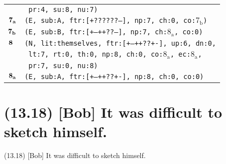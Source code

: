 \documentclass{article}
\begin{document}
\begin{minipage}{\textwidth}
{\begin{tabular}{|r|l|}
    & \texttt{\texttt{~pr:4,~su:8,~nu:7)}} \\
    ${\textbf{\textrm{7}}_{\textbf{\textrm{a}}}}$ & \texttt{\texttt{(E,~sub:A,~ftr:[+??????--],~np:7,~ch:0,~co:${\textrm{7}_{\textrm{b}}}$)}} \\
    ${\textbf{\textrm{7}}_{\textbf{\textrm{b}}}}$ & \texttt{\texttt{(E,~sub:B,~ftr:[+--++??--],~np:7,~ch:${\textrm{8}_{\textrm{a}}}$,~co:0)}} \\
    ${\textbf{\textrm{8}}_{\phantom{z}}}$ & \texttt{\texttt{(N,~lit:themselves,~ftr:[+--++??+-],~up:6,~dn:0,}} \\
    & \texttt{\texttt{~lt:7,~rt:0,~th:0,~np:8,~ch:0,~co:${\textrm{8}_{\textrm{a}}}$,~ec:${\textrm{8}_{\textrm{a}}}$,}} \\
    & \texttt{\texttt{~pr:7,~su:0,~nu:8)}} \\
    ${\textbf{\textrm{8}}_{\textbf{\textrm{a}}}}$ & \texttt{\texttt{(E,~sub:A,~ftr:[+--++??+-],~np:8,~ch:0,~co:0)}} \\
    \hline
  \end{tabular}
  }
\end{minipage}
\bigbreak

\clearpage

%
%

\section*{(13.18) [Bob] It was difficult to sketch himself.}

\bigbreak
\begin{enumerate*}
\item[(13.18)] [Bob] It was difficult to sketch himself.
\end{enumerate*}
\bigbreak
\end{document}
